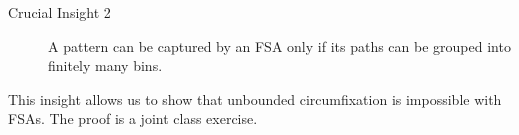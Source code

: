 \begin{description}
    \item[Crucial Insight 2]
    A pattern can be captured by an FSA only if its paths can be grouped into finitely many bins.
\end{description}

This insight allows us to show that unbounded circumfixation is impossible with FSAs.
The proof is a joint class exercise.
%

